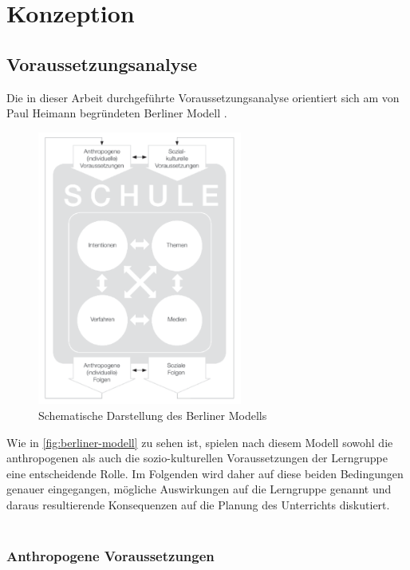 \section{Konzeption}
\label{sec:konzeption}

\subsection{Voraussetzungsanalyse}
\label{subsec:voraussetzungsanalyse}

Die in dieser Arbeit durchgeführte Voraussetzungsanalyse orientiert sich am von Paul Heimann begründeten Berliner Modell \cite[S.~41--70]{arnold2015}.
\begin{figure}[h!]
	\centering
	\includegraphics[width=0.6\textwidth]{media/BerlinerModell.png}
	\caption[Schematische Darstellung des Berliner Modells]{Schematische Darstellung des Berliner Modells \cite[S.~68]{arnold2015}}
	\label{fig:berliner-modell}
\end{figure}
Wie in \autoref{fig:berliner-modell} zu sehen ist, spielen nach diesem Modell sowohl die anthropogenen als auch die sozio-kulturellen Voraussetzungen der Lerngruppe eine entscheidende Rolle.
Im Folgenden wird daher auf diese beiden Bedingungen genauer eingegangen, mögliche Auswirkungen auf die Lerngruppe genannt und daraus resultierende Konsequenzen auf die Planung des Unterrichts diskutiert.\\\\

\subsubsection{Anthropogene Voraussetzungen}
\label{subsubsec:anthropogene-voraussetzungen}

